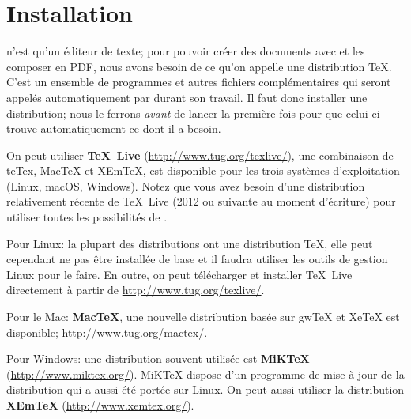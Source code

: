 
\chapter{Installation}
\label{chap.installation}

\Tw{} n'est qu'un éditeur de texte; pour pouvoir créer des documents avec \AllTeX{} et les composer en PDF, nous avons besoin de ce qu'on appelle une distribution \TeX{}. C'est un ensemble de programmes et autres fichiers complémentaires qui seront appelés automatiquement par \Tw{} durant son travail. Il faut donc installer une distribution; nous le ferrons \emph{avant} de lancer \Tw{} la première fois pour que celui-ci trouve automatiquement ce dont il a besoin.

On peut utiliser \textbf{TeX~Live} (\url{http://www.tug.org/texlive/}), une combinaison de teTex, MacTeX et XEmTeX, est disponible pour les trois systèmes d'exploitation (Linux, macOS, Windows). Notez que vous avez besoin d'une distribution relativement récente de TeX~Live (2012 ou suivante au moment d'écriture) pour utiliser toutes les possibilités de {\Tw}.

\begin{OSLinux}
Pour Linux: la plupart des distributions ont une distribution \TeX, elle peut cependant ne pas être installée de base et il faudra utiliser les outils de gestion Linux pour le faire. En outre, on peut télécharger et installer TeX~Live directement à partir de \url{http://www.tug.org/texlive/}.
\end{OSLinux}
\vspace{6pt} 

\begin{OSMac}
Pour le Mac: \textbf{MacTeX}, une nouvelle distribution basée sur gwTeX et XeTeX est disponible; \url{http://www.tug.org/mactex/}.
\end{OSMac}
\vspace{6pt} 

\begin{OSWindows}
Pour Windows: une distribution souvent utilisée est \textbf{MiKTeX} (\url{http://www.miktex.org/}). MiKTeX dispose d'un programme de mise-à-jour de la distribution qui a aussi été portée sur Linux. On peut aussi utiliser la distribution \textbf{XEmTeX} (\url{http://www.xemtex.org/}).
\end{OSWindows}

